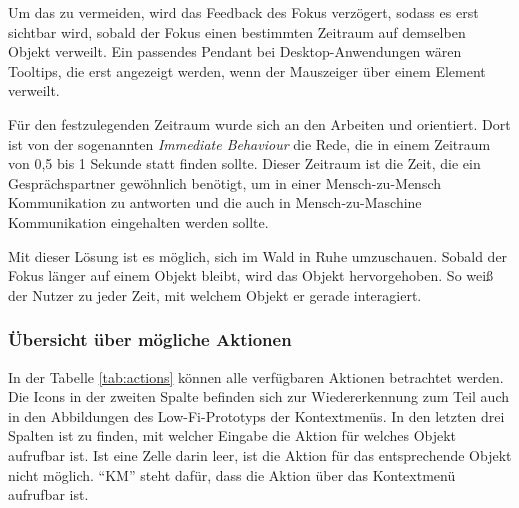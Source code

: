 Um das zu vermeiden, wird das Feedback des Fokus verzögert, sodass es erst sichtbar wird, sobald der Fokus einen bestimmten Zeitraum auf demselben Objekt verweilt. Ein passendes Pendant bei Desktop-Anwendungen wären Tooltips, die erst angezeigt werden, wenn der Mauszeiger über einem Element verweilt.

Für den festzulegenden Zeitraum wurde sich an den Arbeiten \cite{miller1956magical} und \cite{mishunov2015why} orientiert. Dort ist von der sogenannten \textit{Immediate Behaviour} die Rede, die in einem Zeitraum von 0,5 bis 1 Sekunde statt finden sollte. Dieser Zeitraum ist die Zeit, die ein Gesprächspartner gewöhnlich benötigt, um in einer Mensch-zu-Mensch Kommunikation zu antworten und die auch in Mensch-zu-Maschine Kommunikation eingehalten werden sollte.

Mit dieser Lösung ist es möglich, sich im Wald in Ruhe umzuschauen. Sobald der Fokus länger auf einem Objekt bleibt, wird das Objekt hervorgehoben. So weiß der Nutzer zu jeder Zeit, mit welchem Objekt er gerade interagiert.

\subsubsection*{Übersicht über mögliche Aktionen}

In der Tabelle \ref{tab:actions} können alle verfügbaren Aktionen betrachtet werden. Die Icons in der zweiten Spalte befinden sich zur Wiedererkennung zum Teil auch in den Abbildungen des Low-Fi-Prototyps der Kontextmenüs. In den letzten drei Spalten ist zu finden, mit welcher Eingabe die Aktion für welches Objekt aufrufbar ist. Ist eine Zelle darin leer, ist die Aktion für das entsprechende Objekt nicht möglich. "`KM"' steht dafür, dass die Aktion über das Kontextmenü aufrufbar ist.

